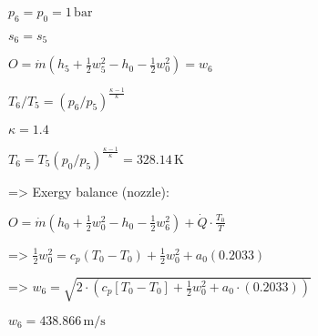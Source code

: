 \( p_6 = p_0 = 1 \, \text{bar} \)  

\( s_6 = s_5 \)  

\( O = \dot{m} \left( h_5 + \frac{1}{2} w_5^2 - h_0 - \frac{1}{2} w_0^2 \right) = w_6 \)  

\( T_6 / T_5 = \left( p_6 / p_5 \right)^{\frac{\kappa - 1}{\kappa}} \)  

\( \kappa = 1.4 \)  

\( T_6 = T_5 \left( p_0 / p_5 \right)^{\frac{\kappa - 1}{\kappa}} = 328.14 \, \text{K} \)  

=> Exergy balance (nozzle):  

\( O = \dot{m} \left( h_0 + \frac{1}{2} w_0^2 - h_0 - \frac{1}{2} w_6^2 \right) + \dot{Q} \cdot \frac{T_0}{T} \)  

=> \( \frac{1}{2} w_0^2 = c_p \left( T_0 - T_0 \right) + \frac{1}{2} w_0^2 + a_0 (0.2033) \)  

=> \( w_6 = \sqrt{2 \cdot \left( c_p \left[ T_0 - T_0 \right] + \frac{1}{2} w_0^2 + a_0 \cdot (0.2033) \right)} \)  

\( w_6 = 438.866 \, \text{m/s} \)